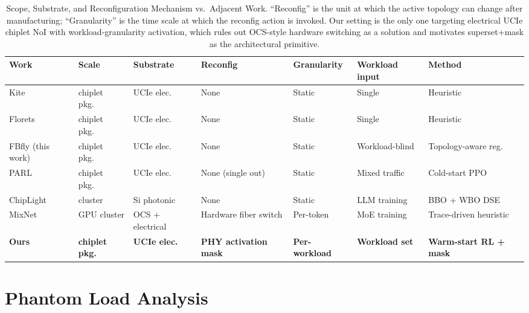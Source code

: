 \documentclass[conference]{IEEEtran}
\begin{document}
\begin{table}[t]
\centering
\caption{Scope, Substrate, and Reconfiguration Mechanism vs.\ Adjacent
  Work. ``Reconfig'' is the unit at which the active topology can change
  after manufacturing; ``Granularity'' is the time scale at which the
  reconfig action is invoked. Our setting is the only one targeting
  electrical UCIe chiplet NoI with workload-granularity activation, which
  rules out OCS-style hardware switching as a solution and motivates
  superset+mask as the architectural primitive.}
\label{tab:scope}
\scriptsize
\begin{tabular}{lllllll}
\toprule
Work & Scale & Substrate & Reconfig & Granularity & Workload input & Method \\
\midrule
Kite~\cite{kite}        & chiplet pkg.\ & UCIe elec.\        & None                 & Static       & Single             & Heuristic \\
Florets~\cite{florets}  & chiplet pkg.\ & UCIe elec.\        & None                 & Static       & Single             & Heuristic \\
FBfly (this work)       & chiplet pkg.\ & UCIe elec.\        & None                 & Static       & Workload-blind     & Topology-aware reg.\ \\
PARL~\cite{parl}        & chiplet pkg.\ & UCIe elec.\        & None (single out)    & Static       & Mixed traffic      & Cold-start PPO \\
ChipLight~\cite{chiplight} & cluster    & Si photonic        & None                 & Static       & LLM training       & BBO + WBO DSE \\
MixNet~\cite{mixnet}    & GPU cluster   & OCS + electrical   & Hardware fiber switch & Per-token   & MoE training       & Trace-driven heuristic \\
\textbf{Ours}           & \textbf{chiplet pkg.} & \textbf{UCIe elec.} & \textbf{PHY activation mask} & \textbf{Per-workload} & \textbf{Workload set} & \textbf{Warm-start RL + mask} \\
\bottomrule
\end{tabular}
\end{table}

\section{Phantom Load Analysis}
\end{document}
